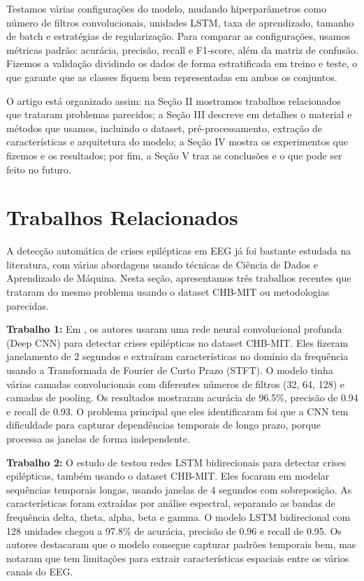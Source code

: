 \documentclass[12pt,a4paper]{article}
\begin{document}
Testamos várias configurações do modelo, mudando hiperparâmetros como número de filtros convolucionais, unidades LSTM, taxa de aprendizado, tamanho de batch e estratégias de regularização. Para comparar as configurações, usamos métricas padrão: acurácia, precisão, recall e F1-score, além da matriz de confusão. Fizemos a validação dividindo os dados de forma estratificada em treino e teste, o que garante que as classes fiquem bem representadas em ambos os conjuntos.

O artigo está organizado assim: na Seção II mostramos trabalhos relacionados que trataram problemas parecidos; a Seção III descreve em detalhes o material e métodos que usamos, incluindo o dataset, pré-processamento, extração de características e arquitetura do modelo; a Seção IV mostra os experimentos que fizemos e os resultados; por fim, a Seção V traz as conclusões e o que pode ser feito no futuro.

\section{Trabalhos Relacionados}

A detecção automática de crises epilépticas em EEG já foi bastante estudada na literatura, com várias abordagens usando técnicas de Ciência de Dados e Aprendizado de Máquina. Nesta seção, apresentamos três trabalhos recentes que trataram do mesmo problema usando o dataset CHB-MIT ou metodologias parecidas.

\textbf{Trabalho 1:} Em \cite{ahmed2020}, os autores usaram uma rede neural convolucional profunda (Deep CNN) para detectar crises epilépticas no dataset CHB-MIT. Eles fizeram janelamento de 2 segundos e extraíram características no domínio da frequência usando a Transformada de Fourier de Curto Prazo (STFT). O modelo tinha várias camadas convolucionais com diferentes números de filtros (32, 64, 128) e camadas de pooling. Os resultados mostraram acurácia de 96.5\%, precisão de 0.94 e recall de 0.93. O problema principal que eles identificaram foi que a CNN tem dificuldade para capturar dependências temporais de longo prazo, porque processa as janelas de forma independente.

\textbf{Trabalho 2:} O estudo de \cite{liu2021} testou redes LSTM bidirecionais para detectar crises epilépticas, também usando o dataset CHB-MIT. Eles focaram em modelar sequências temporais longas, usando janelas de 4 segundos com sobreposição. As características foram extraídas por análise espectral, separando as bandas de frequência delta, theta, alpha, beta e gamma. O modelo LSTM bidirecional com 128 unidades chegou a 97.8\% de acurácia, precisão de 0.96 e recall de 0.95. Os autores destacaram que o modelo consegue capturar padrões temporais bem, mas notaram que tem limitações para extrair características espaciais entre os vários canais do EEG.
\end{document}
